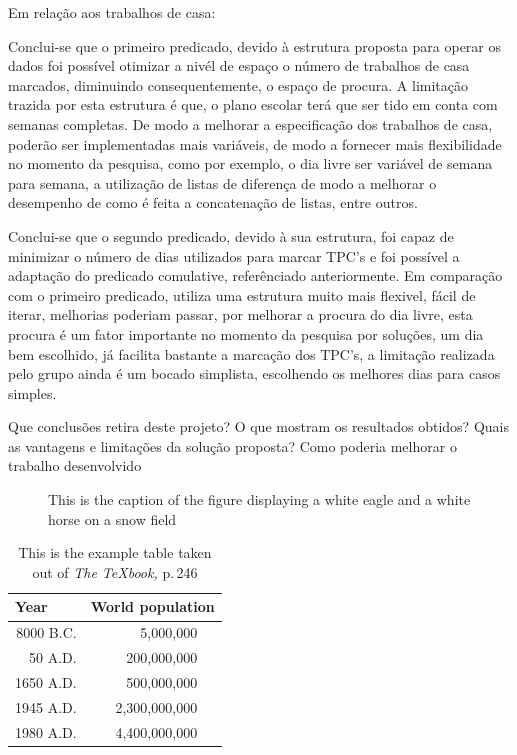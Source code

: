 \documentclass{llncs}
\begin{document}
Em relação aos trabalhos de casa:

Conclui-se que o primeiro predicado, devido à estrutura proposta para operar os dados foi possível otimizar a nivél de espaço o número de trabalhos de casa marcados, diminuindo consequentemente, o espaço de procura. A limitação trazida por esta estrutura é que, o plano escolar terá que ser tido em conta com semanas completas.  De modo a melhorar a especificação dos trabalhos de casa, poderão ser implementadas mais variáveis, de modo a fornecer mais flexibilidade no momento da pesquisa, como por exemplo, o dia livre ser variável de semana para semana, a utilização de listas de diferença de modo a melhorar o desempenho de como é feita a concatenação de listas, entre outros.

Conclui-se que o segundo predicado, devido à sua estrutura, foi capaz de minimizar o número de dias utilizados para marcar TPC's e foi possível a adaptação do predicado comulative, referênciado anteriormente. Em comparação com o primeiro predicado, utiliza uma estrutura muito mais flexivel, fácil de iterar, melhorias poderiam passar, por melhorar a procura do dia livre, esta procura é um fator importante no momento da pesquisa por soluções, um dia bem escolhido, já facilita bastante a marcação dos TPC's, a limitação realizada pelo grupo ainda é um bocado simplista, escolhendo os melhores dias para casos simples.


 Que conclusões retira deste projeto? O que mostram os resultados obtidos? Quais as vantagens e limitações da
solução proposta? Como poderia melhorar o trabalho desenvolvido



\begin{figure}
\vspace{2.5cm}
\caption{This is the caption of the figure displaying a white eagle and
a white horse on a snow field}
\end{figure}

\begin{table}
\caption{This is the example table taken out of {\it The
\TeX{}book,} p.\,246}
\begin{center}
\begin{tabular}{r@{\quad}rl}
\hline
\multicolumn{1}{l}{\rule{0pt}{12pt}
                   Year}&\multicolumn{2}{l}{World population}\\[2pt]
\hline\rule{0pt}{12pt}
8000 B.C.  &     5,000,000& \\
  50 A.D.  &   200,000,000& \\
1650 A.D.  &   500,000,000& \\
1945 A.D.  & 2,300,000,000& \\
1980 A.D.  & 4,400,000,000& \\[2pt]
\hline
\end{tabular}
\end{center}
\end{table}
\end{document}
